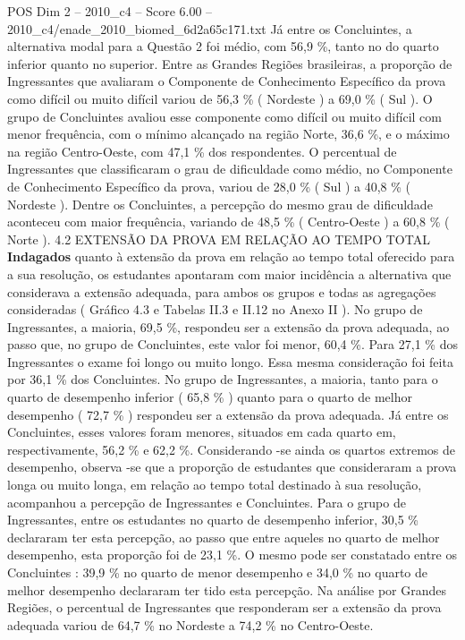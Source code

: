\begin{textsample}{POS Dim 2 – 2010\_c4 – Score 6.00 – 2010\_c4/enade\_2010\_biomed\_6d2a65c171.txt}
Já entre os Concluintes, a alternativa modal para a Questão 2 foi médio, com 56,9 \%, tanto no do quarto inferior quanto no superior.
Entre as Grandes Regiões brasileiras, a proporção de Ingressantes que avaliaram o Componente de Conhecimento Específico da prova como difícil ou muito difícil variou de 56,3 \% ( Nordeste ) a 69,0 \% ( Sul ).
O grupo de Concluintes avaliou esse componente como difícil ou muito difícil com menor frequência, com o mínimo alcançado na região Norte, 36,6 \%, e o máximo na região Centro-Oeste, com 47,1 \% dos respondentes.
O percentual de Ingressantes que classificaram o grau de dificuldade como médio, no Componente de Conhecimento Específico da prova, variou de 28,0 \% ( Sul ) a 40,8 \% ( Nordeste ).
Dentre os Concluintes, a percepção do mesmo grau de dificuldade aconteceu com maior frequência, variando de 48,5 \% ( Centro-Oeste ) a 60,8 \% ( Norte ). 4.2 EXTENSÃO DA PROVA EM RELAÇÃO AO TEMPO TOTAL \textbf{Indagados} quanto à extensão da prova em relação ao tempo total oferecido para a sua resolução, os estudantes apontaram com maior incidência a alternativa que considerava a extensão adequada, para ambos os grupos e todas as agregações consideradas ( Gráfico 4.3 e Tabelas II.3 e II.12 no Anexo II ).
No grupo de Ingressantes, a maioria, 69,5 \%, respondeu ser a extensão da prova adequada, ao passo que, no grupo de Concluintes, este valor foi menor, 60,4 \%.
Para 27,1 \% dos Ingressantes o exame foi longo ou muito longo.
Essa mesma consideração foi feita por 36,1 \% dos Concluintes.
No grupo de Ingressantes, a maioria, tanto para o quarto de desempenho inferior ( 65,8 \% ) quanto para o quarto de melhor desempenho ( 72,7 \% ) respondeu ser a extensão da prova adequada.
Já entre os Concluintes, esses valores foram menores, situados em cada quarto em, respectivamente, 56,2 \% e 62,2 \%.
Considerando -se ainda os quartos extremos de desempenho, observa -se que a proporção de estudantes que consideraram a prova longa ou muito longa, em relação ao tempo total destinado à sua resolução, acompanhou a percepção de Ingressantes e Concluintes.
Para o grupo de Ingressantes, entre os estudantes no quarto de desempenho inferior, 30,5 \% declararam ter esta percepção, ao passo que entre aqueles no quarto de melhor desempenho, esta proporção foi de 23,1 \%.
O mesmo pode ser constatado entre os Concluintes : 39,9 \% no quarto de menor desempenho e 34,0 \% no quarto de melhor desempenho declararam ter tido esta percepção.
Na análise por Grandes Regiões, o percentual de Ingressantes que responderam ser a extensão da prova adequada variou de 64,7 \% no Nordeste a 74,2 \% no Centro-Oeste.

\end{textsample}
